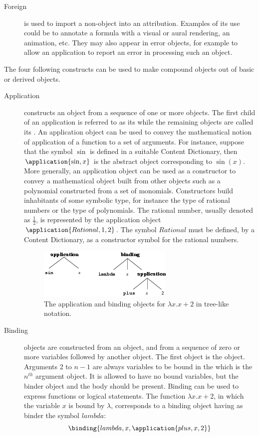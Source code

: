 \begin{description}
\item[Foreign] is used to import a non-\OM object into an \OM attribution.  Examples of
  its use could be to annotate a formula with a visual or aural rendering, an animation,
  etc.  They may also appear in \OM error objects, for example to allow an application to
  report an error in processing such an object.
\end{description}
The four following constructs can be used to make compound \OM objects out of basic or
derived \OM objects.

\begin{description}
\item[Application] constructs an \OM object from a sequence of one or more \OM
  objects. The first child of an application is referred to as its  while
  the remaining objects are called its .  An \OM application object
  can be used to convey the mathematical notion of application of a function to a set of
  arguments.  For instance, suppose that the \OM symbol $\sin$ is defined in a suitable
  Content Dictionary, then $\application{\sin,x}$ is the abstract \OM object
  corresponding to $\sin(x)$.  More generally, an \OM application object can be used as a
  constructor to convey a mathematical object built from other objects such as a
  polynomial constructed from a set of monomials.  Constructors build inhabitants of some
  symbolic type, for instance the type of rational numbers or the type of polynomials.
  The rational number, usually denoted as $\frac12$, is
  represented by the \OM application object $\application{Rational,1,2}$. The symbol
  $Rational$ must be defined, by a Content Dictionary, as a
  constructor symbol for the rational numbers.

  \begin{figure}\centering
    \includegraphics{lambda}
    \caption{The \OM application and binding objects for $\lambda x.x+2$ in tree-like notation.}\label{fig_obj}
  \end{figure}

\item[Binding] objects are
  constructed from an \OM object, and from a sequence of zero or more
  variables followed by another \OM object.  The first \OM object is
  the  object. Arguments 2 to $n-1$ are always variables to
  be bound in the  which is the $n^{th}$ argument object. It
  is allowed to have no bound variables, but the binder object and the
  body should be present. Binding can be used to express functions or
  logical statements.  The function $\lambda x.x+2$, in which
  the variable $x$ is bound by $\lambda$, corresponds to a binding object having
  as binder the \OM symbol $lambda$: 
\[\binding{lambda,x,\application{plus,x,2}}\]


\end{description}
